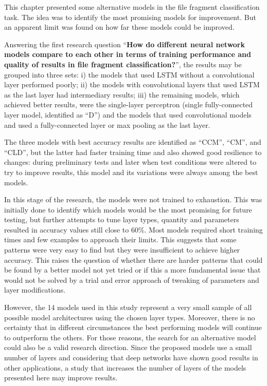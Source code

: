 This chapter presented some alternative models in the file fragment classification task. The idea was to identify the most promising models for improvement. But an apparent limit was found on how far these models could be improved.

Answering the first research question ``\textbf{How do different neural network models compare to each other in terms of training performance and quality of results in file fragment classification?}'', 
the results may be grouped into three sets: i) the models that used LSTM without a convolutional layer performed poorly; ii) the models with convolutional layers that used LSTM as the last layer had intermediary results; iii) the remaining models, which achieved better results, were the single-layer perceptron (single fully-connected layer model, identified as ``D'') and the models that used convolutional models and used a fully-connected layer or max pooling as the last layer.

The three models with best accuracy results are identified as ``CCM'', ``CM'', and ``CLD'', but the latter had faster training time and also showed good resilience to changes: during preliminary tests and later when test conditions were altered to try to improve results, this model and its variations were always among the best models.

In this stage of the research, the models were not trained to exhaustion.
This was initially done to identify which models would be the most promising for future testing, but further attempts to tune layer types, quantity and parameters resulted in accuracy values still close to 60\%.
Most models required short training times and few examples to approach their limits.
This suggests that some patterns were very easy to find but they were insufficient to achieve higher accuracy.
This raises the question of whether there are harder patterns that could be found by a better model not yet tried or if this a more fundamental issue that would not be solved by a trial and error approach of tweaking of parameters and layer modifications.

However, the 14 models used in this study represent a very small sample of all possible model architectures using the chosen layer types. Moreover, there is no certainty that in different circumstances the best performing models will continue to outperform the others. For those reasons, the search for an alternative model could also be a valid research direction. Since the proposed models use a small number of layers and considering that deep networks have shown good results in other applications, a study that increases the number of layers of the models presented here may improve results.

